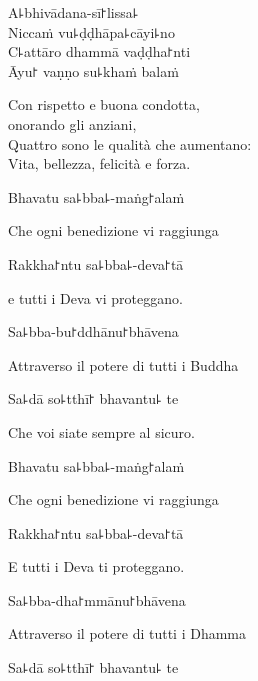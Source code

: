 A꜕bhivādana-sī꜓lissa꜕\\
Niccaṁ vu꜕ḍḍhāpa꜕cāyi꜕no\\
C꜕attāro dhammā vaḍḍha꜓nti\\
Āyu꜓ vaṇṇo su꜕khaṁ balaṁ
 
\begin{english}
  Con rispetto e buona condotta,\\
 onorando gli anziani,\\
  Quattro sono le qualità che aumentano:\\
  Vita, bellezza, felicità e forza.
\end{english}

Bhavatu sa꜕bba꜕-maṅg꜓alaṁ


\begin{english}
  Che ogni benedizione vi raggiunga
\end{english}

Rakkha꜓ntu sa꜕bba꜕-deva꜓tā

\begin{english}
  e tutti i Deva vi proteggano.
\end{english}

Sa꜕bba-bu꜓ddhānu꜓bhāvena

\begin{english}
  Attraverso il potere di tutti i Buddha
\end{english}

Sa꜕dā so꜕tthī꜓ bhavantu꜕ te

\begin{english}
Che voi siate sempre al sicuro.
\end{english}

\ifaivedition
\clearpage
\fi

Bhavatu sa꜕bba꜕-maṅg꜓alaṁ

\begin{english}
Che ogni benedizione vi raggiunga
\end{english}

Rakkha꜓ntu sa꜕bba꜕-deva꜓tā

\begin{english}
E tutti i Deva ti proteggano.
\end{english}

Sa꜕bba-dha꜓mmānu꜓bhāvena

\begin{english}
  Attraverso il potere di tutti i Dhamma
\end{english}

Sa꜕dā so꜕tthī꜓ bhavantu꜕ te

